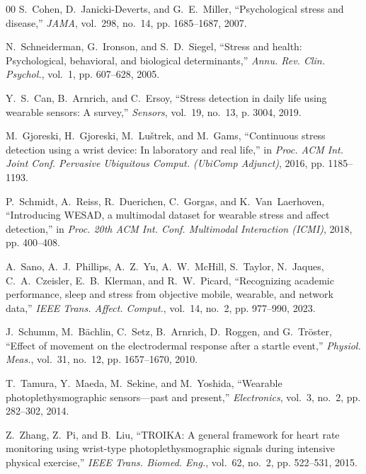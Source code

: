 \documentclass[conference]{IEEEtran}
\begin{document}
\begin{thebibliography}{00}
S.~Cohen, D.~Janicki-Deverts, and G.~E.~Miller, ``Psychological stress and disease,'' \textit{JAMA}, vol.~298, no.~14, pp. 1685--1687, 2007.

N.~Schneiderman, G.~Ironson, and S.~D.~Siegel, ``Stress and health: Psychological, behavioral, and biological determinants,'' \textit{Annu. Rev. Clin. Psychol.}, vol.~1, pp. 607--628, 2005.

Y.~S.~Can, B.~Arnrich, and C.~Ersoy, ``Stress detection in daily life using wearable sensors: A survey,'' \textit{Sensors}, vol.~19, no.~13, p. 3004, 2019.

M.~Gjoreski, H.~Gjoreski, M.~Lu\v{s}trek, and M.~Gams, ``Continuous stress detection using a wrist device: In laboratory and real life,'' in \textit{Proc. ACM Int. Joint Conf. Pervasive Ubiquitous Comput. (UbiComp Adjunct)}, 2016, pp. 1185--1193.

P.~Schmidt, A.~Reiss, R.~Duerichen, C.~Gorgas, and K.~Van~Laerhoven, ``Introducing WESAD, a multimodal dataset for wearable stress and affect detection,'' in \textit{Proc. 20th ACM Int. Conf. Multimodal Interaction (ICMI)}, 2018, pp. 400--408.

A.~Sano, A.~J.~Phillips, A.~Z.~Yu, A.~W.~McHill, S.~Taylor, N.~Jaques, C.~A.~Czeisler, E.~B.~Klerman, and R.~W.~Picard, ``Recognizing academic performance, sleep and stress from objective mobile, wearable, and network data,'' \textit{IEEE Trans. Affect. Comput.}, vol.~14, no.~2, pp. 977--990, 2023.

J.~Schumm, M.~B\"achlin, C.~Setz, B.~Arnrich, D.~Roggen, and G.~Tr\"oster, ``Effect of movement on the electrodermal response after a startle event,'' \textit{Physiol. Meas.}, vol.~31, no.~12, pp. 1657--1670, 2010.

T.~Tamura, Y.~Maeda, M.~Sekine, and M.~Yoshida, ``Wearable photoplethysmographic sensors---past and present,'' \textit{Electronics}, vol.~3, no.~2, pp. 282--302, 2014.

Z.~Zhang, Z.~Pi, and B.~Liu, ``TROIKA: A general framework for heart rate monitoring using wrist-type photoplethysmographic signals during intensive physical exercise,'' \textit{IEEE Trans. Biomed. Eng.}, vol.~62, no.~2, pp. 522--531, 2015.


\end{thebibliography}
\end{document}
